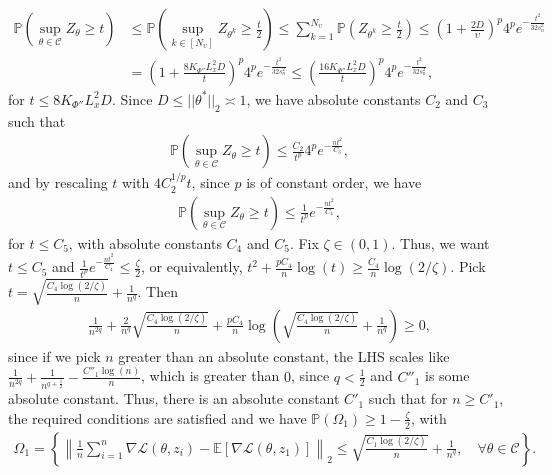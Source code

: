 \documentclass{article}
\begin{document}
\begin{align*}
\mathbb{P}\left(\mathop{\sup}\limits_{\theta \in \mathcal{C}}Z_\theta \geq t\right) &\leq \mathbb{P}\left(\mathop{\sup}\limits_{k \in [N_\upsilon]}Z_{\theta^k} \geq \frac{t}{2}\right)\leq \sum_{k = 1}^{N_{\upsilon}}\mathbb{P}\left(Z_{\theta^k} \geq \frac{t}{2}\right) \leq \left(1 + \frac{2D}{\upsilon}\right)^p4^pe^{-\frac{t^2}{32s_n^2}}\\
&= \left(1 + \frac{8K_{\Phi''}L_x^2D}{t}\right)^p4^pe^{-\frac{t^2}{32s_n^2}} \leq \left(\frac{16K_{\Phi''}L_x^2D}{t}\right)^p4^pe^{-\frac{t^2}{32s_n^2}},
\end{align*}
for $t \leq 8K_{\Phi''}L_x^2D$. Since $D \leq ||\theta^*||_2 \asymp 1$, we have absolute constants $C_2$ and $C_3$ such that
\begin{align*}
\mathbb{P}\left(\mathop{\sup}\limits_{\theta \in \mathcal{C}}Z_\theta \geq t\right)\leq \frac{C_2}{t^p}4^pe^{-\frac{nt^2}{C_3}},
\end{align*}
and by rescaling $t$ with $4C_2^{1/p}t$, since $p$ is of constant order, we have 
\begin{align*}
\mathbb{P}\left(\mathop{\sup}\limits_{\theta \in \mathcal{C}}Z_\theta \geq t\right)\leq \frac{1}{t^p}e^{-\frac{nt^2}{C_4}},
\end{align*}
for $t \leq C_5$, with absolute constants $C_4$ and $C_5$. Fix $\zeta \in (0, 1)$. Thus, we want $t \leq C_5$ and $\frac{1}{t^p}e^{-\frac{nt^2}{C_4}} \leq \frac{\zeta}{2}$, or equivalently, $t^2 + \frac{pC_4}{n}\log(t) \geq \frac{C_4}{n}\log(2/\zeta)$. Pick $t = \sqrt{\frac{C_4\log(2/\zeta)}{n}} + \frac{1}{n^q}$. Then
\begin{align*}
\frac{1}{n^{2q}} + \frac{2}{n^q}\sqrt{\frac{C_4\log(2/\zeta)}{n}} + \frac{pC_4}{n}\log\left(\sqrt{\frac{C_4\log(2/\zeta)}{n}} + \frac{1}{n^q}\right) \geq 0,
\end{align*}
since if we pick $n$ greater than an absolute constant, the LHS scales like $\frac{1}{n^{2q}} + \frac{1}{n^{q + \frac{1}{2}}} - \frac{C''_1\log(n)}{n}$, which is greater than $0$, since $q < \frac{1}{2}$ and $C''_1$ is some absolute constant. Thus, there is an absolute constant $C'_1$ such that for $n \geq C'_1$,
the required conditions are satisfied and we have $\mathbb{P}(\Omega_1) \geq 1 - \frac{\zeta}{2}$, with
\begin{align*}
\Omega_1 = \left\{\left\|\frac{1}{n}\sum_{i = 1}^n\nabla \mathcal{L}(\theta, z_i) - \mathbb{E}[\nabla \mathcal{L}(\theta, z_1)]\right\|_2 \leq \sqrt{\frac{C_1\log(2/\zeta)}{n}} + \frac{1}{n^q}, \quad \forall \theta \in \mathcal{C}\right\}.
\end{align*}
\end{document}
